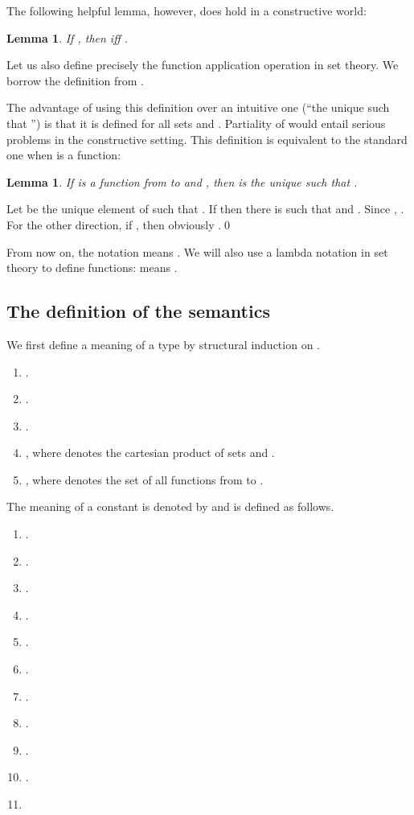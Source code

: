\documentclass{LMCS}
\newtheorem{lemma}[thm]{Lemma}
\newcommand{\ignore}[1]{}
\begin{document}
The following helpful lemma, however, does hold in a constructive world:
\begin{lemma}\label{lp01}
If , then  iff . 
\end{lemma}
\ignore
{
\proof
Left-to-right direction is immediate, for right-to-left we have  and need to show that . Suppose , then ,
but , so .\qed
}
Let us also define precisely the function application operation in set theory. We borrow the definition from 
\cite{Acz99a}. 

The advantage of using this definition over an intuitive one (``the unique  such that '') is 
that it is defined for all sets  and . Partiality of  would
entail serious problems in the constructive setting.
This definition is equivalent to the standard one when  is a function:
\begin{lemma}
If  is a function from  to  and , then  is the
unique  such that . 
\end{lemma}
\proof
Let  be the unique element of  such that .
If  then there is  such that  and . Since , . For the other direction, if ,
then obviously .\qed

From now on, the notation  means . We will also use a lambda
notation in set theory to define functions:  means .

\subsection{The definition of the semantics}

We first define a meaning  of a type  by structural induction on .
\begin{enumerate}[]
\item . 
\item . 
\item . 
\item , where  denotes the cartesian product of sets  and . 
\item , where  denotes the set of all functions from  to . 
\end{enumerate}

The meaning of a constant  is denoted by  and is 
defined as follows.

\begin{enumerate}[]
\item .
\item .
\item . 
\item . 
\item . 
\item . 
\item .
\item .
\item .
\item .
\item 
\end{enumerate}
\end{document}
